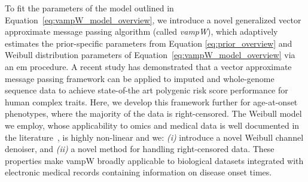 To fit the parameters of the model outlined in Equation~\eqref{eq:vampW_model_overview}, we introduce a novel generalized vector approximate message passing algorithm (called \emph{vampW}), %
which adaptively estimates the prior-specific parameters from Equation \eqref{eq:prior_overview} and Weibull distribution parameters of Equation~\ref{eq:vampW_model_overview} via an \acrfull{em} procedure. %
A recent study \cite{Depope2026} has demonstrated that a vector approximate message passing framework can be applied to imputed and whole-genome sequence data to achieve state-of-the art polygenic risk score performance for human complex traits.
Here, we develop this framework further for age-at-onset phenotypes, where the majority of the data is right-censored. The Weibull model we employ, whose applicability to omics and medical data is well documented in the literature~\cite{Ojavee2021-zu, plana_cancer_2022,duan_bayesian_2018}, is highly non-linear and we: \textit{(i)} introduce a novel Weibull channel denoiser, and \textit{(ii)} a novel method for handling right-censored data. %
These properties make vampW broadly applicable to biological datasets integrated with electronic medical records containing information on disease onset times.

